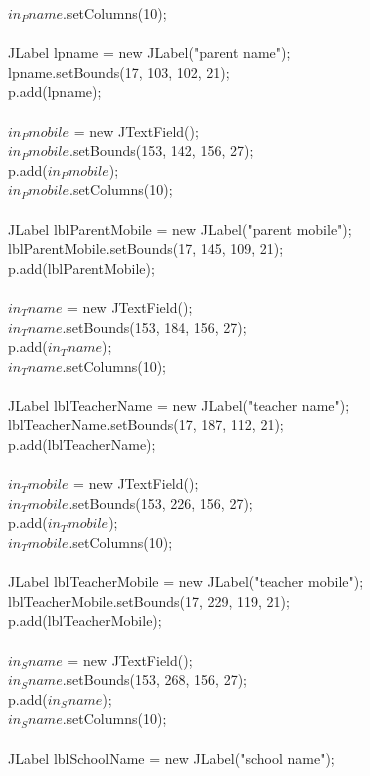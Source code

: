 \documentclass[a4paper,11pt]{IEEEtran}
\begin{document}
{{{{$in_Pname$.setColumns(10);\\
~\\
JLabel lpname = new JLabel("parent name");\\
lpname.setBounds(17, 103, 102, 21);\\
p.add(lpname);\\
~\\
$in_Pmobile$ = new JTextField();\\
$in_Pmobile$.setBounds(153, 142, 156, 27);\\
p.add($in_Pmobile$);\\
$in_Pmobile$.setColumns(10);\\
~\\
JLabel lblParentMobile = new JLabel("parent mobile");\\
lblParentMobile.setBounds(17, 145, 109, 21);\\
p.add(lblParentMobile);\\
~\\
$in_Tname$ = new JTextField();\\
$in_Tname$.setBounds(153, 184, 156, 27);\\
p.add($in_Tname$);\\
$in_Tname$.setColumns(10);\\
~\\
JLabel lblTeacherName = new JLabel("teacher name");\\
lblTeacherName.setBounds(17, 187, 112, 21);\\
p.add(lblTeacherName);\\
~\\
$in_Tmobile$ = new JTextField();\\
$in_Tmobile$.setBounds(153, 226, 156, 27);\\
p.add($in_Tmobile$);\\
$in_Tmobile$.setColumns(10);\\
~\\
JLabel lblTeacherMobile = new JLabel("teacher mobile");\\
lblTeacherMobile.setBounds(17, 229, 119, 21);\\
p.add(lblTeacherMobile);\\
~\\
$in_Sname$ = new JTextField();\\
$in_Sname$.setBounds(153, 268, 156, 27);\\
p.add($in_Sname$);\\
$in_Sname$.setColumns(10);\\
~\\
JLabel lblSchoolName = new JLabel("school name");\\
}}}}
\end{document}
